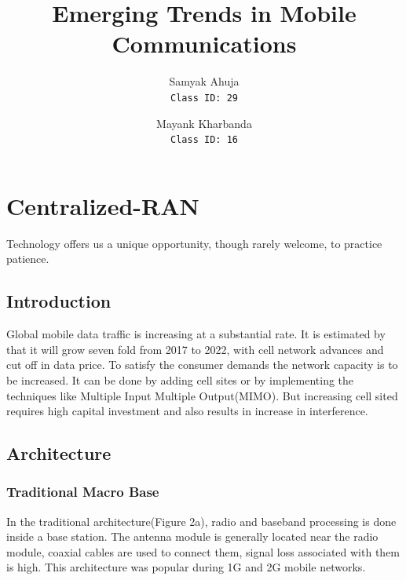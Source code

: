 \documentclass{article}
\title{Emerging Trends in Mobile Communications}
\author{
    Samyak Ahuja \\
    \texttt{Class ID: 29}
    \and
    Mayank Kharbanda \\
    \texttt{Class ID: 16}
}
\begin{document}
\maketitle

\section{Centralized-RAN}

\epigraph{Technology offers us a unique opportunity, 
though rarely welcome, to practice patience.}
{\parencite{patience12}}

\subsection{Introduction}

Global mobile data traffic is increasing at a substantial rate. 
It is estimated by \textcite{cisco19} that it will grow seven fold
from 2017 to 2022, with cell network advances and cut off in 
data price. To satisfy the consumer demands the network capacity 
is to be increased. It can be done by adding cell sites or by 
implementing the techniques like Multiple Input Multiple 
Output(MIMO). But increasing cell sited requires high capital 
investment and also results in increase in interference.
\nocite{checko14}


\subsection{Architecture}


\subsubsection{Traditional Macro Base}


In the traditional architecture(Figure 2a), radio and baseband
processing is done inside a base station. The antenna module 
is generally located near the radio module, coaxial cables
are used to connect them, signal loss associated with them is 
high. This architecture was popular during 1G and 2G mobile 
networks.\nocite{checko14}



\end{document}
